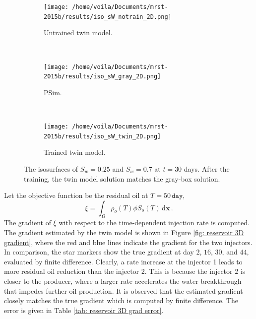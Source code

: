 \begin{figure}[htbp]\begin{center}
    \begin{subfigure}[t]{.99\textwidth}
        \centering
        \texttt{[image: /home/voila/Documents/mrst-2015b/results/iso\_sW\_notrain\_2D.png]}
        \label{fig: reservoir 3D untrained}
        \caption{Untrained twin model.}
    \end{subfigure}\\
    \begin{subfigure}[t]{.99\textwidth}
        \centering
        \texttt{[image: /home/voila/Documents/mrst-2015b/results/iso\_sW\_gray\_2D.png]}
        \label{fig: reservoir 3D untrained}
        \caption{PSim.}
    \end{subfigure}\\
    \begin{subfigure}[t]{.99\textwidth}
        \centering
        \texttt{[image: /home/voila/Documents/mrst-2015b/results/iso\_sW\_twin\_2D.png]}
        \label{fig: reservoir 3D untrained}
        \caption{Trained twin model.}
    \end{subfigure}
    \caption{The isosurfaces of $S_w=0.25$ and $S_w=0.7$ at $t=30$ days. After the training,
             the twin model solution matches the gray-box solution.}
    \label{fig: reservoir 3D solutions}
\end{center}\end{figure}

Let the objective function be the residual oil at $T=50 \, \texttt{day}$,
\begin{equation}
    \xi = \int_\Omega \rho_o(T) \phi S_o(T) \,\textrm{d} \boldsymbol{x} \,.
    \label{eqn: chap2 reservoir xi day 50}
\end{equation}
The gradient of $\xi$ with respect to the time-dependent injection rate is computed.
The gradient estimated by the twin model is shown in Figure \ref{fig: reservoir 3D gradient},
where the red and blue lines indicate the gradient for the two injectors. In comparison, 
the star markers show the true gradient at day $2$, $16$, $30$, and $44$, evaluated by finite difference.
Clearly, a rate increase at the injector 1 leads to more residual oil reduction than the injector 2.
This is because the injector 2 is closer to the producer, where a larger rate accelerates the 
water breakthrough that impedes further oil production.
It is observed that the estimated gradient closely matches the true gradient which
is computed by finite difference.
The error is given in Table \ref{tab: reservoir 3D grad error}.\\


